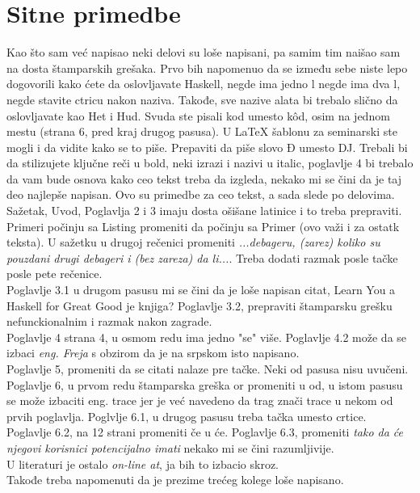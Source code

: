 \documentclass[a4paper]{report}
\begin{document}
\section{Sitne primedbe}
Kao što sam već napisao neki delovi su loše napisani, pa samim tim naišao sam na dosta štamparskih grešaka. Prvo bih napomenuo da se između sebe niste lepo dogovorili kako ćete da oslovljavate Haskell, negde ima jedno l negde ima dva l, negde stavite ctricu nakon naziva. Takođe, sve nazive alata bi trebalo slično da oslovljavate kao Het i Hud. Svuda ste pisali kod umesto k\^{o}d, osim na jednom mestu (strana 6, pred kraj drugog pasusa). U LaTeX šablonu za seminarski ste mogli i da vidite kako se to piše. Prepaviti da piše slovo Đ umesto DJ. Trebali bi da stilizujete ključne reči u bold, neki izrazi i nazivi u italic, poglavlje 4 bi trebalo da vam bude osnova kako ceo tekst treba da izgleda, nekako mi se čini da je taj deo najlepše napisan. Ovo su primedbe za ceo tekst, a sada slede po delovima.\\
Sažetak, Uvod, Poglavlja 2 i 3 imaju dosta ošišane latinice i to treba prepraviti. Primeri počinju sa Listing promeniti da počinju sa Primer (ovo važi i za ostatk teksta). U sažetku u drugoj rečenici promeniti \emph{...debageru, (zarez) koliko su pouzdani drugi debageri i (bez zareza) da li...}.
Treba dodati razmak posle tačke posle pete rečenice.\\
Poglavlje 3.1 u drugom pasusu mi se čini da je loše napisan citat, Learn You a Haskell for Great Good je knjiga? Poglavlje 3.2, prepraviti štamparsku grešku nefunckionalnim i razmak nakon zagrade.\\
Poglavlje 4 strana 4, u osmom redu ima jedno "se" više. Poglavlje 4.2 može da se izbaci \emph{eng. Freja} s obzirom da je na srpskom isto napisano.\\
Poglavlje 5, promeniti da se citati nalaze pre tačke. Neki od pasusa nisu uvučeni. \\
Poglavlje 6, u prvom redu štamparska greška or promeniti u od, u istom pasusu se može izbaciti eng. trace jer je već navedeno da trag znači trace u nekom od prvih poglavlja. Poglvlje 6.1, u drugog pasusu treba tačka umesto crtice. Poglavlje 6.2, na 12 strani promeniti če u će. Poglavlje 6.3, promeniti \emph{tako da će njegovi korisnici potencijalno imati} nekako mi se čini razumljivije. \\ U literaturi je ostalo \emph{on-line at}, ja bih to izbacio skroz.
\\ Takođe treba napomenuti da je prezime trećeg kolege loše napisano.
\end{document}
